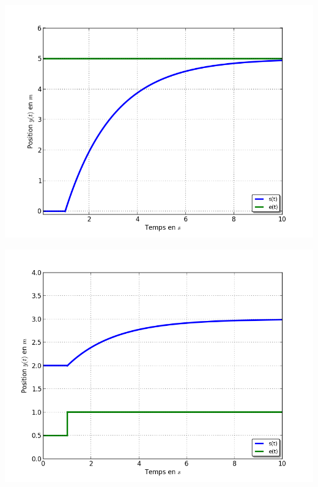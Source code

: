 \begin{minipage}[c]{.49\linewidth}
\begin{center}
\includegraphics[width=\textwidth]{png/courbe3-1O}
\end{center}
\end{minipage}\hfill
\begin{minipage}[c]{.49\linewidth}
\begin{center}
\includegraphics[width=\textwidth]{png/courbe4-1O}
\end{center}
\end{minipage}
\newpage

